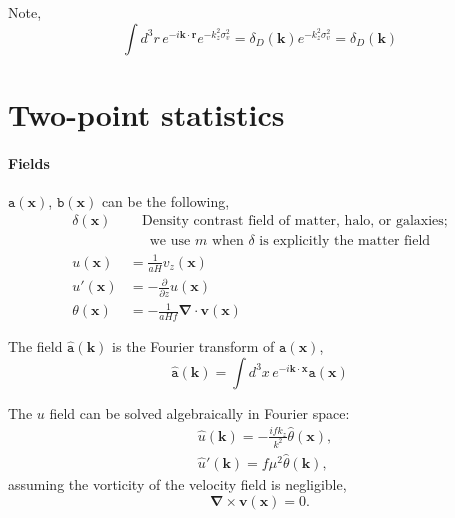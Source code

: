 \documentclass[a4paper,11pt, fleqn]{article}
\begin{document}
Note,
\begin{equation}
  \int\! d^3 r \, e^{-i\bm{k}\cdot\bm{r}} e^{-k_z^2 \sigma_v^2}
  = \delta_D(\bm{k}) e^{-k_z^2 \sigma_v^2} = \delta_D(\bm{k})
\end{equation}

\clearpage
%
%
\appendix

\sectionfont{\sffamily\Huge\color{Blue}\selectfont}
\subsectionfont{\sffamily\color{Blue}\selectfont}
\subsubsectionfont{\sffamily\color{Blue}\selectfont}
\paragraphfont{\sffamily\color{Blue}\selectfont}

%
%
\section{Two-point statistics}

\paragraph{Fields}
$\mathtt{a}(\bm{x})$, $\mathtt{b}(\bm{x})$ can be the following,
%
\begin{align}
  \delta(\bm{x}) &\phantom{=\,} \mbox{Density contrast field of matter, halo, or galaxies;}\\
            &\phantom{=\,} \mbox{we use $m$ when $\delta$ is explicitly the matter field}\\
  u(\bm{x}) &= \frac{1}{aH} v_z(\bm{x})\\
  u'(\bm{x}) &= -\frac{\partial}{\partial z} u(\bm{x})\\
  \theta(\bm{x}) &= - \frac{1}{aHf} \bm{\nabla}\cdot \bm{v}(\bm{x})
\end{align}

\vspace{5mm}
The field $\hat{\texttt{a}}(\bm{k})$ is
the Fourier transform of $\texttt{a}(\bm{x})$, 
\begin{equation}
  \hat{\texttt{a}}(\bm{k}) =
  \int\! d^3 x \, e^{-i\bm{k}\cdot\bm{x}} \texttt{a}(\bm{x})
\end{equation}

The $u$ field can be solved algebraically in Fourier space:
%
\begin{align}
  &\hat{u}(\bm{k}) = -\frac{ifk_z}{k^2} \hat{\theta}(\bm{x}),\\
  &\hat{u}'(\bm{k}) = f\mu^2 \hat{\theta}(\bm{k}),
\end{align}
%
assuming the vorticity of the velocity field is negligible,
%
\begin{equation}
  \bm{\nabla} \times \bm{v}(\bm{x}) = 0.
\end{equation}
\end{document}
